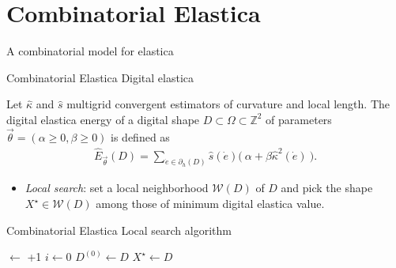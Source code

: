 \section{Combinatorial Elastica}

\begin{frame}
\begin{center}
\huge
A combinatorial model for elastica
\end{center}
\end{frame}

\begin{frame}
	{Combinatorial Elastica}	
	{Digital elastica}
%	
		\begin{definition}
		Let $\hat{\kappa}$ and $\hat{s}$ multigrid convergent estimators of curvature and local length. The digital elastica energy of a digital shape $D \subset \Omega \subset \mathbb{Z}^2$ of parameters $\vec{\theta} = (\alpha \geq 0, \beta \geq 0)$ is defined as
%		
		\begin{align*}
			\hat{E}_{\vec{\theta}}(D) = \sum_{\dot{e} \in \partial_h(D)}{\hat{s}(\dot{e}) \Big(\: \alpha + \beta \hat{\kappa}^2(\dot{e}) \: \Big). }
		\end{align*}
	\end{definition}
%	
	\begin{itemize}
		\item<2->{\emph{Local search}: set a local neighborhood $\mathcal{W}(D)$ of $D$ and pick the shape $X^{\star} \in \mathcal{W}(D)$ among those of minimum digital elastica value.}
	\end{itemize}
\end{frame}

\begin{frame}
	{Combinatorial Elastica}	
	{Local search algorithm}

\begin{algorithm}[H]
 
 \BlankLine
 \Delta $\longleftarrow$ \Tol+1\;
 $i \longleftarrow 0$\;
 $D^{(0)} \longleftarrow D$\;
 $X^\star \longleftarrow D$\;
\end{algorithm}
\end{frame}

